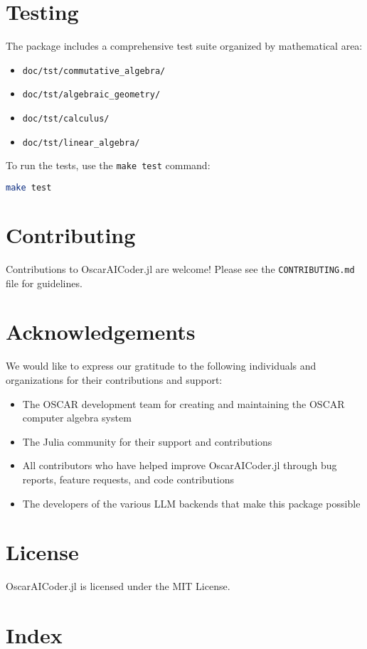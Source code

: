 \documentclass[11pt,a4paper]{article}
\begin{document}



\section{Testing}
\label{sec:testing}

The package includes a comprehensive test suite organized by mathematical area:

\begin{itemize}
    \item \texttt{doc/tst/commutative\_algebra/}
    \item \texttt{doc/tst/algebraic\_geometry/}
    \item \texttt{doc/tst/calculus/}
    \item \texttt{doc/tst/linear\_algebra/}
\end{itemize}

To run the tests, use the \texttt{make test} command:

\begin{lstlisting}[language=bash]
make test
\end{lstlisting}

\section{Contributing}
\label{sec:contributing}

Contributions to OscarAICoder.jl are welcome! Please see the \texttt{CONTRIBUTING.md} file for guidelines.

\section*{Acknowledgements}
\label{sec:acknowledgements}

We would like to express our gratitude to the following individuals and organizations for their contributions and support:

\begin{itemize}
    \item The OSCAR development team for creating and maintaining the OSCAR computer algebra system
    \item The Julia community for their support and contributions
    \item All contributors who have helped improve OscarAICoder.jl through bug reports, feature requests, and code contributions
    \item The developers of the various LLM backends that make this package possible
\end{itemize}

\section{License}
\label{sec:license}

OscarAICoder.jl is licensed under the MIT License.

\clearpage
\section*{Index}
\printindex
\end{document}
